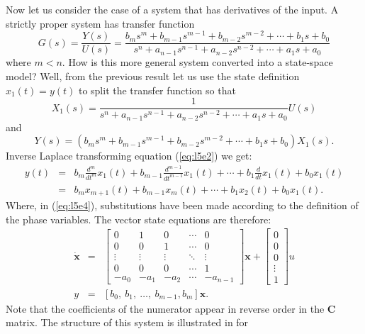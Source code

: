 Now let us consider the case of a system that has derivatives of
the input. A strictly proper system has transfer function
\[G(s)=\frac{Y(s)}{U(s)} = \frac{b_ms^m +
b_{m-1}s^{m-1}+b_{m-2}s^{m-2}+\cdots+b_1s+b_0}{s^n +
a_{n-1}s^{n-1}+a_{n-2}s^{n-2}+\cdots+a_1s+a_0}\] where $m<n$. How
is this more general system converted into a state-space model?
Well, from the previous result let us use the state definition
$x_1(t) = y(t)$ to split the transfer function so that
\begin{equation}\label{eq:l5e1}
X_1(s) = \frac{1}{s^n +
a_{n-1}s^{n-1}+a_{n-2}s^{n-2}+\cdots+a_1s+a_0}U(s)
\end{equation}
and
\begin{equation}\label{eq:l5e2}
Y(s) = \left(b_ms^m +
b_{m-1}s^{m-1}+b_{m-2}s^{m-2}+\cdots+b_1s+b_0\right)X_1(s).\end{equation}
Inverse Laplace transforming equation (\ref{eq:l5e2}) we get:
\begin{eqnarray}\label{eq:l5e3}
y(t) & = & b_m\frac{d^m}{dt^m}x_1(t) +
b_{m-1}\frac{d^{m-1}}{dt^{m-1}}x_1(t)+\cdots+b_1\frac{d}{dt}x_1(t)+
b_0x_1(t)\\ & = & b_mx_{m+1}(t) + b_{m-1}x_m(t)+\cdots+b_1x_2(t)+
b_0x_1(t).\label{eq:l5e4}
\end{eqnarray}
Where, in (\ref{eq:l5e4}), substitutions have been made according
to the definition of the phase variables. The vector state
equations are therefore: \begin{eqnarray*} \dot{\mathbf{x}} &=&
\left[\begin{array}{ccccc}
  0 & 1 & 0 & \cdots & 0 \\
  0 & 0 & 1 & \cdots & 0 \\
  \vdots & \vdots & \vdots & \ddots & \vdots \\
  0 & 0 & 0 & \cdots & 1 \\
  -a_{0} & -a_{1} & -a_{2} & \cdots & -a_{n-1}
\end{array}\right]\mathbf{x}+\left[\begin{array}{c}
  0 \\
  0 \\
  0 \\
  \vdots \\
  1
\end{array}\right]u\\
y & = & [b_0,\ b_1,\ \dots,\ b_{m-1}, b_m]
\mathbf{x}.\end{eqnarray*} Note that the coefficients of the
numerator appear in reverse order in the $\mathbf{C}$ matrix. The
structure of this system is illustrated in  for
